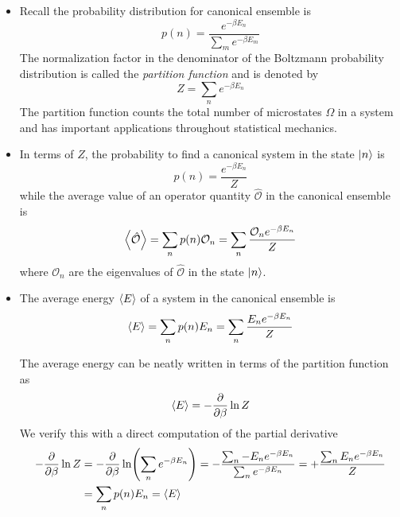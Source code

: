 \documentclass[11pt, a4paper]{article}
\begin{document}
\begin{itemize}
	\item Recall the probability distribution for canonical ensemble is
	\begin{equation*}
		p(n) =  \frac{ e^{-\beta E_{n}}}{\sum_{m} e^{-\beta E_{m}}}
	\end{equation*}
	The normalization factor in the denominator of the Boltzmann probability distribution is called the \textit{partition function} and is denoted by
	\begin{equation*}
		Z = \sum_{n} e^{-\beta E_{n}}
	\end{equation*}
	The partition function counts the total number of microstates $ \Omega $ in a system and has important applications throughout statistical mechanics. 
	
	\item In terms of $ Z $, the probability to find a canonical system in the state $ \ket{n} $ is
	\begin{equation*}
		p(n) = \frac{e^{-\beta E_{n}}}{Z}
	\end{equation*}
	while the average value of an operator quantity $ \hat{\mathcal{O}} $ in the canonical ensemble is
	\begin{equation*}
		\expval{\hat{\mathcal{O}}} = \sum_{n}p(n) \mathcal{O}_{n} = \sum_{n} \frac{ \mathcal{O}_{n}e^{-\beta E_{n}}}{Z}
	\end{equation*}
	where $ \mathcal{O}_{n} $ are the eigenvalues of $  \hat{\mathcal{O}} $ in the state $ \ket{n} $.
	
	\item The average energy $ \expval{E} $ of a system in the canonical ensemble is
	\begin{equation*}
		\expval{E} = \sum_{n}p(n)E_{n} = \sum_{n} \frac{E_{n}e^{-\beta E_{n}}}{Z}
	\end{equation*}
	
	The average energy can be neatly written in terms of the partition function as
	\begin{equation*}
		\expval{E} = - \pdv{}{\beta} \ln Z
	\end{equation*}
	We verify this with a direct computation of the partial derivative
	\begin{align*}
		- \pdv{}{\beta} \ln Z &= - \pdv{}{\beta} \ln(\sum_{n}e^{-\beta E_{n}}) = - \frac{\sum_{n}-E_{n}e^{-\beta E_{n}}}{\sum_{n}e^{-\beta E_{n}}} = + \frac{\sum_{n}E_{n}e^{-\beta E_{n}}}{Z} \\
		&= \sum_{n}p(n)E_{n} = \expval{E} 
	\end{align*}
	\vspace{-5mm}


\end{itemize}
\end{document}
